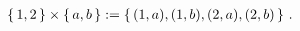 \guard



\begin{exmp}
\label{exmp:cartesianProductEasy}
  \begin{align*}
    \left\{\,1,2\,\right\}\times\left\{\,a,b\,\right\} := \left\{\, (1,a),(1,b),(2,a),(2,b)\,\right\}\,.
  \end{align*}
\end{exmp}

